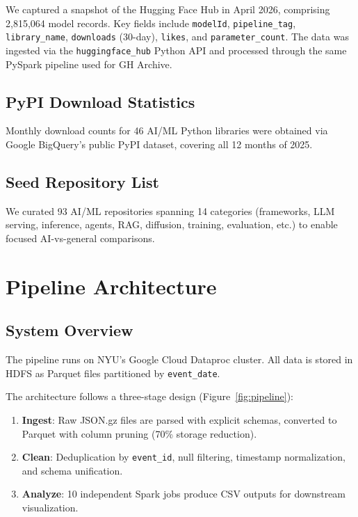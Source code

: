 \documentclass[11pt,twocolumn]{article}
\begin{document}
We captured a snapshot of the Hugging Face Hub in April 2026, comprising 2,815,064 model records.
Key fields include \texttt{modelId}, \texttt{pipeline\_tag}, \texttt{library\_name}, \texttt{downloads} (30-day), \texttt{likes}, and \texttt{parameter\_count}.
The data was ingested via the \texttt{huggingface\_hub} Python API and processed through the same PySpark pipeline used for GH Archive.

\subsection{PyPI Download Statistics}

Monthly download counts for 46 AI/ML Python libraries were obtained via Google BigQuery's public PyPI dataset, covering all 12 months of 2025.

\subsection{Seed Repository List}

We curated 93 AI/ML repositories spanning 14 categories (frameworks, LLM serving, inference, agents, RAG, diffusion, training, evaluation, etc.) to enable focused AI-vs-general comparisons.

\section{Pipeline Architecture}\label{sec:pipeline}

\subsection{System Overview}

The pipeline runs on NYU's Google Cloud Dataproc cluster.
All data is stored in HDFS as Parquet files partitioned by \texttt{event\_date}.

The architecture follows a three-stage design (Figure~\ref{fig:pipeline}):
\begin{enumerate}[nosep]
  \item \textbf{Ingest}: Raw JSON.gz files are parsed with explicit schemas, converted to Parquet with column pruning (70\% storage reduction).
  \item \textbf{Clean}: Deduplication by \texttt{event\_id}, null filtering, timestamp normalization, and schema unification.
  \item \textbf{Analyze}: 10 independent Spark jobs produce CSV outputs for downstream visualization.
\end{enumerate}
\end{document}
